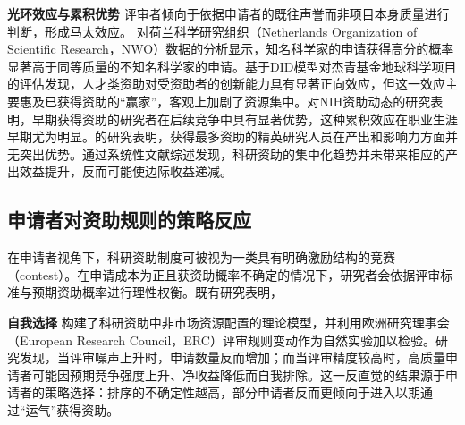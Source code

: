 \textbf{光环效应与累积优势} \quad 评审者倾向于依据申请者的既往声誉而非项目本身质量进行判断，形成马太效应。 \cite{bolthijsMatthewEffectScience2018}对荷兰科学研究组织（Netherlands Organization of Scientific Research，NWO）数据的分析显示，知名科学家的申请获得高分的概率显著高于同等质量的不知名科学家的申请。\cite{TianJiYuDIDMoXingDeKeJiZhengCeChuangXinNengLiZiZhuXiaoYingShiZhengYanJiuYiJieQingJiJinDiQiuKeXueXiangMuWeiLi2018}基于DID模型对杰青基金地球科学项目的评估发现，人才类资助对受资助者的创新能力具有显著正向效应，但这一效应主要惠及已获得资助的“赢家”，客观上加剧了资源集中。\cite{qiuMatthewEffectResearch2023}对NIH资助动态的研究表明，早期获得资助的研究者在后续竞争中具有显著优势，这种累积效应在职业生涯早期尤为明显。\cite{mongeonConcentrationResearchFunding2016}的研究表明，获得最多资助的精英研究人员在产出和影响力方面并无突出优势。\cite{aagaardConcentrationDispersalResearch2020}通过系统性文献综述发现，科研资助的集中化趋势并未带来相应的产出效益提升，反而可能使边际收益递减。

\subsection{\textbf{申请者对资助规则的策略反应}}

在申请者视角下，科研资助制度可被视为一类具有明确激励结构的竞赛（contest）。在申请成本为正且获资助概率不确定的情况下，研究者会依据评审标准与预期资助概率进行理性权衡。既有研究表明，


\textbf{自我选择} \quad \cite{addaGrantmakingGradingCurve2024}构建了科研资助中非市场资源配置的理论模型，并利用欧洲研究理事会（European Research Council，ERC）评审规则变动作为自然实验加以检验。研究发现，当评审噪声上升时，申请数量反而增加；而当评审精度较高时，高质量申请者可能因预期竞争强度上升、净收益降低而自我排除。这一反直觉的结果源于申请者的策略选择：排序的不确定性越高，部分申请者反而更倾向于进入以期通过“运气”获得资助。


